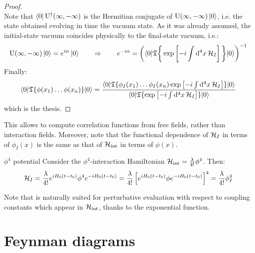 \begin{proofbox}
\begin{proof}
\begin{equation*}
    \end{equation*}
    Note that $ \bra{0} \mathrm{U}^\dagger(\infty,-\infty) $ is the Hermitian conjugate of $ \mathrm{U}(\infty,-\infty) \ket{0} $, i.e. the state obtained evolving in time the vacuum state. As it was already assumed, the initial-state vacuum coincides physically to the final-state vacuum, i.e.:
    \begin{equation*}
      \mathrm{U}(\infty,-\infty) \ket{0} = e^{i\alpha} \ket{0}
      \qquad \Rightarrow \qquad
      e^{-i \alpha} = \left( \braket{0 | \mathfrak{T}\bigg\{ \exp \left[ -i \int \mathrm{d}^4x\, \mathcal{H}_I \right] \bigg\} | 0} \right)^{-1}
    \end{equation*}
    Finally:
    \begin{equation*}
    \braket{0 | \mathfrak{T}\{\phi(x_1) \dots \phi(x_n)\} | 0} = \frac{\braket{0 | \mathfrak{T}\{\phi_I(x_1) \dots \phi_I(x_n) \exp \left[ -i \int \mathrm{d}^4x\, \mathcal{H}_I \right]\} | 0}}{\braket{0 | \mathfrak{T}\{\exp \left[ -i \int \mathrm{d}^4x\, \mathcal{H}_I \right]\} |0}}
    \end{equation*}
    which is the thesis.
  \end{proof}
\end{proofbox}

This allows to compute correlation functions from free fields, rather than interaction fields. Moreover, note that the functional dependence of $ \mathcal{H}_I $ in terms of $ \phi_I(x) $ is the same as that of $ \mathcal{H}_\text{int} $ in terms of $ \phi(x) $.

\begin{example}{$ \phi^4 $ potential}{}
  Consider the $ \phi^4 $-interaction Hamiltonian $ \mathcal{H}_\text{int} = \frac{\lambda}{4!} \phi^4 $. Then:
  \begin{equation*}
    \begin{split}
      \mathcal{H}_I = \frac{\lambda}{4!} e^{i H_0 (t-t_0)} \phi^4 e^{-i H_0 (t-t_0)} = \frac{\lambda}{4!} \left[ e^{i H_0 (t-t_0)} \phi e^{-i H_0 (t-t_0)} \right]^4 = \frac{\lambda}{4!} \phi_I^4
    \end{split}
  \end{equation*}
\end{example}

Note that  is naturally suited for perturbative evaluation with respect to coupling constants which appear in $ \mathcal{H}_\text{int} $, thanks to the exponential function.

\section{Feynman diagrams}

